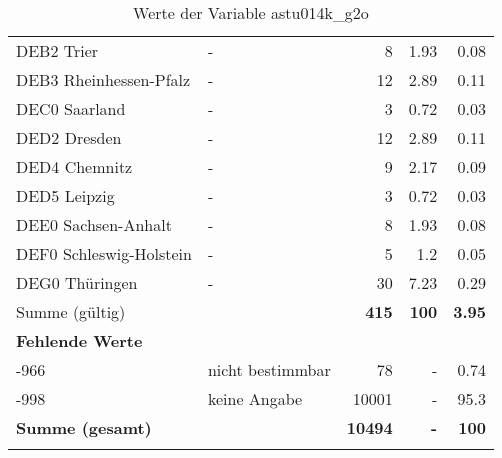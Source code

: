 \begin{longtable}{Xlrrr}
        \multicolumn{1}{X}{DEB2 Trier} & - & \num{8} & \num[round-mode=places,round-precision=2]{1.93} & \num[round-mode=places,round-precision=2]{0.08} \\
        \multicolumn{1}{X}{DEB3 Rheinhessen-Pfalz} & - & \num{12} & \num[round-mode=places,round-precision=2]{2.89} & \num[round-mode=places,round-precision=2]{0.11} \\
        \multicolumn{1}{X}{DEC0 Saarland} & - & \num{3} & \num[round-mode=places,round-precision=2]{0.72} & \num[round-mode=places,round-precision=2]{0.03} \\
        \multicolumn{1}{X}{DED2 Dresden} & - & \num{12} & \num[round-mode=places,round-precision=2]{2.89} & \num[round-mode=places,round-precision=2]{0.11} \\
        \multicolumn{1}{X}{DED4 Chemnitz} & - & \num{9} & \num[round-mode=places,round-precision=2]{2.17} & \num[round-mode=places,round-precision=2]{0.09} \\
        \multicolumn{1}{X}{DED5 Leipzig} & - & \num{3} & \num[round-mode=places,round-precision=2]{0.72} & \num[round-mode=places,round-precision=2]{0.03} \\
        \multicolumn{1}{X}{DEE0 Sachsen-Anhalt} & - & \num{8} & \num[round-mode=places,round-precision=2]{1.93} & \num[round-mode=places,round-precision=2]{0.08} \\
        \multicolumn{1}{X}{DEF0 Schleswig-Holstein} & - & \num{5} & \num[round-mode=places,round-precision=2]{1.2} & \num[round-mode=places,round-precision=2]{0.05} \\
        \multicolumn{1}{X}{DEG0 Thüringen} & - & \num{30} & \num[round-mode=places,round-precision=2]{7.23} & \num[round-mode=places,round-precision=2]{0.29} \\
     \midrule
      \multicolumn{2}{l}{Summe (gültig)} & \textbf{\num{415}} &
      \textbf{\num{100}} &
         \textbf{\num[round-mode=places,round-precision=2]{3.95}} \\
     \multicolumn{5}{l}{\textbf{Fehlende Werte}}\\
       -966 & nicht bestimmbar & \num{78} & - & \num[round-mode=places,round-precision=2]{0.74} \\

       -998 & keine Angabe & \num{10001} & - & \num[round-mode=places,round-precision=2]{95.3} \\

     \midrule
     \multicolumn{2}{l}{\textbf{Summe (gesamt)}} & \textbf{\num{10494}} & \textbf{-} & \textbf{\num{100}} \\
     \bottomrule
     \caption{Werte der Variable astu014k\_g2o}
     \end{longtable}
     

